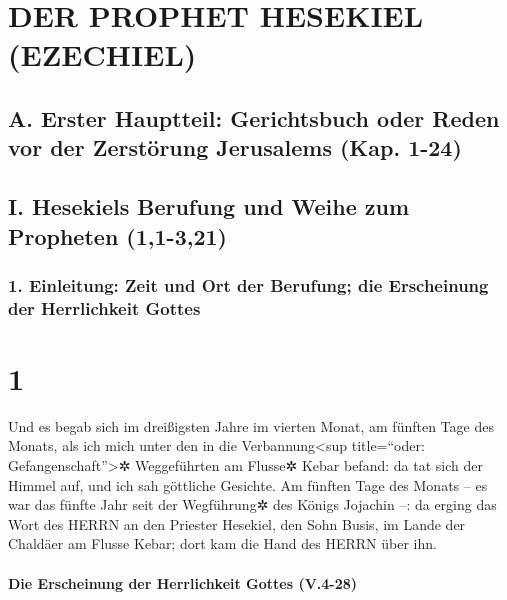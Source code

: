 \hypertarget{der-prophet-hesekiel-ezechiel}{%
\section{DER PROPHET HESEKIEL
(EZECHIEL)}\label{der-prophet-hesekiel-ezechiel}}

\hypertarget{a.-erster-hauptteil-gerichtsbuch-oder-reden-vor-der-zerstuxf6rung-jerusalems-kap.-1-24}{%
\subsection{A. Erster Hauptteil: Gerichtsbuch oder Reden vor der
Zerstörung Jerusalems (Kap.
1-24)}\label{a.-erster-hauptteil-gerichtsbuch-oder-reden-vor-der-zerstuxf6rung-jerusalems-kap.-1-24}}

\hypertarget{i.-hesekiels-berufung-und-weihe-zum-propheten-11-321}{%
\subsection{I. Hesekiels Berufung und Weihe zum Propheten
(1,1-3,21)}\label{i.-hesekiels-berufung-und-weihe-zum-propheten-11-321}}

\hypertarget{einleitung-zeit-und-ort-der-berufung-die-erscheinung-der-herrlichkeit-gottes}{%
\subsubsection{1. Einleitung: Zeit und Ort der Berufung; die Erscheinung
der Herrlichkeit
Gottes}\label{einleitung-zeit-und-ort-der-berufung-die-erscheinung-der-herrlichkeit-gottes}}

\hypertarget{section}{%
\section{1}\label{section}}

Und es begab sich im dreißigsten Jahre im vierten Monat,
am fünften Tage des Monats, als ich mich unter den in die
Verbannung\textless sup title=``oder: Gefangenschaft''\textgreater✲
Weggeführten am Flusse✲ Kebar befand: da tat sich der Himmel auf, und
ich sah göttliche Gesichte. Am fünften Tage des Monats --
es war das fünfte Jahr seit der Wegführung✲ des Königs Jojachin --:
da erging das Wort des HERRN an den Priester Hesekiel, den
Sohn Busis, im Lande der Chaldäer am Flusse Kebar; dort kam die Hand des
HERRN über ihn.

\hypertarget{die-erscheinung-der-herrlichkeit-gottes-v.4-28}{%
\paragraph{Die Erscheinung der Herrlichkeit Gottes
(V.4-28)}\label{die-erscheinung-der-herrlichkeit-gottes-v.4-28}}

